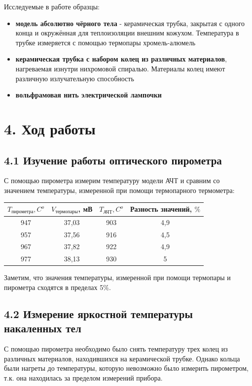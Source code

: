 \documentclass[a4paper,12pt]{report}
\begin{document}
Исследуемые в работе образцы:
\begin{itemize}
    \item \textbf{модель абсолютно чёрного тела} - керамическая трубка, закрытая с одного конца и окружённая для теплоизоляции внешним кожухом. Температура в трубке измеряется с помощью термопары хромель-алюмель
    \item \textbf{керамическая трубка с набором колец из различных материалов}, нагреваемая изнутри нихромовой спиралью. Материалы колец имеют различную излучательную способность
    \item \textbf{вольфрамовая нить электрической лампочки}
\end{itemize}

\section*{4. Ход работы}
\subsection*{4.1 Изучение работы оптического пирометра}
С помощью пирометра измерим температуру модели АЧТ и сравним со значением температуры, измеренной при помощи термопарного термометра:
\begin{table}[H]
\begin{tabular}{|c|c|c|c|}
\hline
$T_{\text{пирометра}}, C^{o}$ & $V_{\text{термопары}}$, мВ & $T_{\text{АЧТ}}, C^{o}$ & Разность   значений, $\%$ \\ \hline
947        & 37,03     & 903  & 4,9                     \\ \hline
957        & 37,56     & 916  & 4,5                     \\ \hline
967        & 37,82     & 922  & 4,9                     \\ \hline
977        & 38,13     & 930  & 5                       \\ \hline
\end{tabular}
\end{table}

Заметим, что значения температуры, измеренной при помощи термопары и пирометра сходятся в пределах 5$\%$.
\subsection*{4.2 Измерение яркостной температуры накаленных тел}
С помощью пирометра необходимо было снять температуру трех колец из различных материалов, находившихся на керамической трубке. Однако кольца были нагреты до температуры, которую невозможно было измерить пирометром, т.к. она находилась за пределом измерений прибора.
\end{document}
